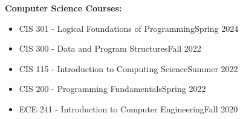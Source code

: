 \documentclass{article}
\begin{document}
\textbf{Computer Science Courses:}
\begin{itemize}
	\item CIS 301 - Logical Foundations of Programming\hfill Spring 2024
	\item CIS 300 - Data and Program Structures\hfill Fall 2022
	\item CIS 115 - Introduction to Computing Science\hfill Summer 2022
	\item CIS 200 - Programming Fundamentals\hfill Spring 2022
	\item ECE 241 - Introduction to Computer Engineering\hfill Fall 2020\\[0pt]
\end{itemize}
\end{document}

